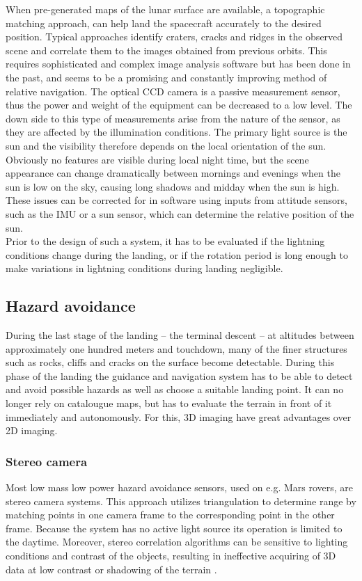 When pre-generated maps of the lunar surface are available, a topographic matching approach, can help land the spacecraft accurately to the desired position. Typical approaches identify craters, cracks and ridges in the observed scene and correlate them to the images obtained from previous orbits. This requires sophisticated and complex image analysis software but has been done in the past, and seems to be a promising and constantly improving method of relative navigation. The optical CCD camera is a passive measurement sensor, thus the power and weight of the equipment can be decreased to a low level. The down side to this type of measurements arise from the nature of the sensor, as they are affected by the illumination conditions. The primary light source is the sun and the visibility therefore depends on the local orientation of the sun. Obviously no features are visible during local night time, but the scene appearance can change dramatically between mornings and evenings when the sun is low on the sky, causing long shadows and midday when the sun is high. These issues can be corrected for in software using inputs from attitude sensors, such as the IMU or a sun sensor, which can determine the relative position of the sun.\\
Prior to the design of such a system, it has to be evaluated if the lightning conditions change during the landing, or if the rotation period is long enough to make variations in lightning conditions during landing negligible. 


\subsection{Hazard avoidance}\label{sec:hazard_avoidance}

During the last stage of the landing – the terminal descent – at altitudes between approximately one hundred meters and touchdown, many of the finer structures such as rocks, cliffs and cracks on the surface become detectable. During this phase of the landing the guidance and navigation system has to be able to detect and avoid possible hazards as well as choose a suitable landing point. It can no longer rely on catalougue maps, but has to evaluate the terrain in front of it immediately and autonomously. For this, 3D imaging have great advantages over 2D imaging. 



\subsubsection{Stereo camera}
Most low mass low power hazard avoidance sensors, used on e.g. Mars rovers, are stereo camera systems. This approach utilizes triangulation to determine range by matching points in one camera frame to the corresponding point in the other frame. Because the system has no active light source its operation is limited to the daytime. Moreover, stereo correlation algorithms can be sensitive to lighting conditions and contrast of the objects, resulting in ineffective acquiring of 3D data at low contrast or shadowing of the terrain \cite{structuredlight}.
 

